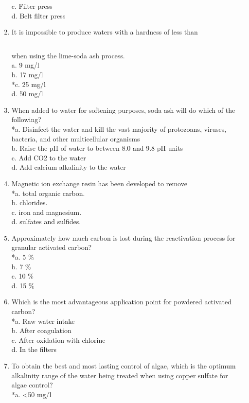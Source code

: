 \begin{enumerate}
c. Filter press\\
d. Belt filter press\\
\item It is impossible to produce waters with a hardness of less than \rule{01.5cm}{0.5pt} when using the lime-soda ash process.\\
a. 9 mg/l\\
b. 17 mg/l \\
*c. 25 mg/l \\
d. 50 mg/l \\
\item When added to water for softening purposes, soda ash will do which of the following?\\
*a. Disinfect the water and kill the vast majority of protozoans, viruses, bacteria, and other multicellular organisms\\
b. Raise the pH of water to between 8.0 and 9.8 pH units\\
c. Add CO2 to the water\\
d. Add calcium alkalinity to the water\\
\item Magnetic ion exchange resin has been developed to remove\\
*a. total organic carbon.\\
b. chlorides.\\
c. iron and magnesium.\\
d. sulfates and sulfides.
\item Approximately how much carbon is lost during the reactivation process for granular activated carbon?\\
*a. 5 \%\\
b. 7 \%\\
c. 10 \%\\
d. 15 \%\\
\item Which is the most advantageous application point for powdered activated carbon?\\
*a. Raw water intake\\
b. After coagulation\\
c. After oxidation with chlorine\\
d. In the filters\\
\item To obtain the best and most lasting control of algae, which is the optimum alkalinity range of the water being treated when using copper sulfate for algae control?\\
*a. <50 mg/l\\

\end{enumerate}
